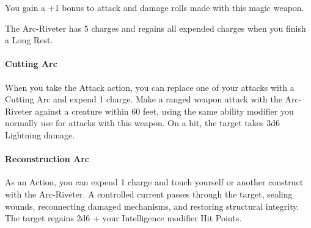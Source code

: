 \documentclass[letterpaper,openany,oneside,twocolumn]{book}
\begin{document}
You gain a +1 bonus to attack and damage rolls made with this magic weapon.

The Arc-Riveter has 5 charges and regains all expended charges when you finish a Long Rest.\\
\paragraph*{Cutting Arc} When you take the Attack action, you can replace one of your attacks with a Cutting Arc and expend 1 charge. Make a ranged weapon attack with the Arc-Riveter against a creature within 60 feet, using the same ability modifier you normally use for attacks with this weapon. On a hit, the target takes 3d6 Lightning damage.\\
\paragraph*{Reconstruction Arc} As an Action, you can expend 1 charge and touch yourself or another construct with the Arc-Riveter. A controlled current passes through the target, sealing wounds, reconnecting damaged mechanisms, and restoring structural integrity. The target regains 2d6 + your Intelligence modifier Hit Points.
\end{document}
